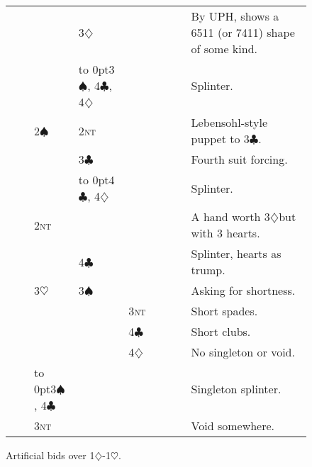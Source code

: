 \documentclass{report}
\renewcommand{\c}{\ensuremath{\clubsuit}}
\renewcommand{\d}{\ensuremath{\diamondsuit}}
\newcommand{\h}{\ensuremath{\heartsuit}}
\newcommand{\s}{\ensuremath{\spadesuit}}
\newcommand{\nt}{\textsc{nt}}
\newcommand{\+}{\ensuremath{^+}}
\begin{document}
\begin{figure}[ht]
\begin{tabular}{lllllllll}
& & & 3\d & & & & & By UPH, shows a 6511 (or 7411) shape of some kind. \\
& & & \hbox to 0pt{3\s, 4\c, 4\d} & & & & & Splinter. \\
& & 2\s & 2\nt & & & & & Lebensohl-style puppet to 3\c. \\
& & & 3\c & & & & & Fourth suit forcing. \\
& & & \hbox to 0pt{4\c, 4\d} & & & & & Splinter. \\
& & 2\nt & & & & & & A hand worth 3\d but with 3 hearts. \\
& & & 4\c & & & & & Splinter, hearts as trump. \\
& & 3\h & 3\s & & & & & Asking for shortness. \\
& & & & 3\nt & & & & Short spades. \\
& & & & 4\c & & & & Short clubs. \\
& & & & 4\d & & & & No singleton or void. \\
& & \hbox to 0pt{3\s, 4\c} & & & & & & Singleton splinter. \\
& & 3\nt & & & & & & Void somewhere. \\

\end{tabular}
\caption{Artificial bids over 1\d-1\h.}
\end{figure}
\end{document}
